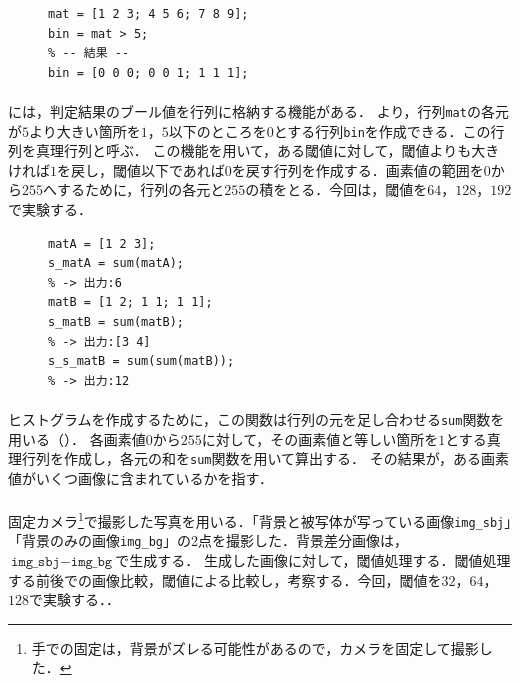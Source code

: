 \begin{figure}
    \centering
    \vspace{-.7cm}
    \begin{lstlisting}[caption={判定結果の格納},label={src:判定結果の格納}]
mat = [1 2 3; 4 5 6; 7 8 9];
bin = mat > 5;
% -- 結果 --
bin = [0 0 0; 0 0 1; 1 1 1];     
    \end{lstlisting}
    \vspace{-.5cm}
\end{figure}
\paragraph{\kadaiad}
\matlab には，判定結果のブール値を行列に格納する機能がある．
より，行列\texttt{mat}の各元が\(5\)より大きい箇所を\(1\)，\(5\)以下のところを\(0\)とする行列\texttt{bin}を作成できる．この行列を真理行列と呼ぶ．
この機能を用いて，ある閾値に対して，閾値よりも大きければ\(1\)を戻し，閾値以下であれば\(0\)を戻す行列を作成する．画素値の範囲を\(0\)から\(255\)へするために，行列の各元と\(255\)の積をとる．今回は，閾値を\(64\)，\(128\)，\(192\)で実験する．\scall{\kadaiad}

\begin{figure}
    \centering
    \vspace{-.9cm}
    \begin{lstlisting}[caption={\texttt{sum}関数},label={src:sum関数}]
matA = [1 2 3];
s_matA = sum(matA); 
% -> 出力:6
matB = [1 2; 1 1; 1 1];
s_matB = sum(matB); 
% -> 出力:[3 4]
s_s_matB = sum(sum(matB)); 
% -> 出力:12
    \end{lstlisting}
    \vspace{-.7cm}
\end{figure}
\paragraph{\kadaiae}
ヒストグラムを作成するために，この関数は行列の元を足し合わせる\texttt{sum}関数を用いる（）．
各画素値\(0\)から\(255\)に対して，その画素値と等しい箇所を\(1\)とする真理行列を作成し，各元の和を\texttt{sum}関数を用いて算出する．
その結果が，ある画素値がいくつ画像に含まれているかを指す．
\paragraph{\kadaiaf}
固定カメラ\footnote{手での固定は，背景がズレる可能性があるので，カメラを固定して撮影した．}で撮影した写真を用いる．「背景と被写体が写っている画像\texttt{img\_sbj}」「背景のみの画像\texttt{img\_bg}」の2点を撮影した．背景差分画像は，\(\texttt{img\_sbj}-\texttt{img\_bg}\)で生成する．
生成した画像に対して，閾値処理する．閾値処理する前後での画像比較，閾値による比較し，考察する．今回，閾値を\(32\)，\(64\)，\(128\)で実験する．\scall{\kadaiaf}．
